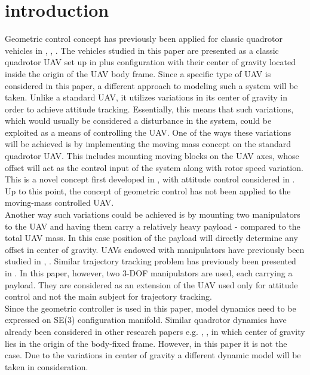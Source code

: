 \section{introduction}

Geometric control concept has previously been applied for classic quadrotor vehicles in \cite{LeeClanak4}, \cite{LeeClanak3}, \cite{LeeClanak1}. The vehicles studied in this paper are presented as a classic quadrotor UAV set up in plus configuration with their center of gravity located inside the origin of the UAV body frame. Since a specific type of UAV is considered in this paper, a different approach to modeling such a system will be taken. Unlike a standard UAV, it utilizes variations in its center of gravity in order to achieve attitude tracking. Essentially, this means that such variations, which would usually be considered a disturbance in the system, could be exploited as a means of controlling the UAV. 
One of the ways these variations will be achieved is by implementing the moving mass concept on the standard quadrotor UAV. This includes mounting moving blocks on the UAV axes, whose offset will act as the control input of the system along with rotor speed variation. This is a novel concept first developed in \cite{movingMass1},\cite{movingMass2} with attitude control considered in \cite{movingMass3}. Up to this point, the concept of geometric control has not been applied to the moving-mass controlled UAV.  \\
Another way such variations could be achieved is by mounting two manipulators to the UAV and having them carry a relatively heavy payload - compared to the total UAV mass. In this case position of the payload will directly determine any offset in center of gravity. UAVs endowed with manipulators have previously been studied in \cite{manipulator1}, \cite{manipulator2}. Similar trajectory tracking problem has previously been presented in \cite{manipulator3}. In this paper, however, two 3-DOF manipulators are used, each carrying a payload. They are considered as an extension of the UAV used only for attitude control and not the main subject for trajectory tracking. \\
Since the geometric controller is used in this paper, model dynamics need to be expressed on SE(3) configuration manifold. Similar quadrotor dynamics have already been considered in other research papers e.g. \cite{LeeClanak4}, \cite{LeeClanak2}, \cite{LeeClanak1} in which center of gravity lies in the origin of the body-fixed frame. However, in this paper it is not the case. Due to the variations in center of gravity a different dynamic model will be taken in consideration. \\
